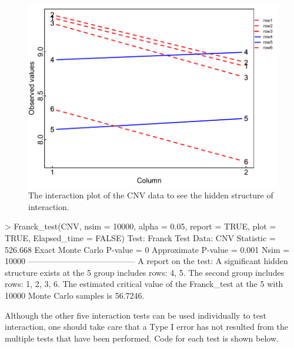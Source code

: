 \begin{figure}[htbp]
	\centering
	\includegraphics[scale=0.75]{interactionplot2.pdf}
	\caption{The interaction plot of the CNV data to see the hidden structure of interaction.}
	\label{fig:2}
\end{figure}

\begin{example} 
	> Franck_test(CNV, nsim = 10000, alpha = 0.05, report = TRUE, plot = TRUE,
	Elapsed_time = FALSE)
	Test:   Franck Test 
	Data:   CNV 
	Statistic =  526.668 
	Exact Monte Carlo P-value =  0 
	Approximate P-value =  0.001 
	Nsim =  10000 
	--------------------------------------- 
	A report on the test:
	A  significant  hidden  structure  exists  at  the 5%
	group  includes  rows:  4, 5. The second group includes rows: 1, 2, 3,
	6.  The  estimated  critical  value of the Franck_test at the 5%
	with 10000 Monte Carlo samples is 56.7246. 
\end{example} 
 
Although the other five interaction tests can be used individually to test interaction, one should take care that a {Type I error} has not resulted from the multiple tests that have been performed. Code for each test is shown below.
   
